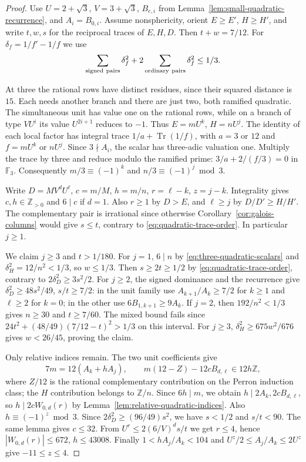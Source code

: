 \documentclass[11pt,reqno]{amsart}
\theoremstyle{remark}\newtheorem{remark}[theorem]{Remark}
\numberwithin{equation}{section}
\begin{document}
\begin{proof}
Use $U=2+\sqrt3$, $V=3+\sqrt3$, $B_{e,i}$ from
Lemma~\ref{lem:small-quadratic-recurrence}, and $A_i=B_{0,i}$.
Assume nonsphericity, orient $E\ge E'$, $H\ge H'$, and write
$t,w,s$ for the reciprocal traces of $E,H,D$. Then $t+w=7/12$.
For $\delta_f=1/f'-1/f$ we use
\begin{equation}\label{eq:twelve-312-mixed}
 \sum_{\rm signed\ pairs}\delta_f^2+
 2\sum_{\rm ordinary\ pairs}\delta_f^2\le1/3 .
\end{equation}

At three the rational rows have distinct residues, since their
squared distance is $15$. Each needs another branch and there
are just two, both ramified quadratic. The simultaneous unit has
value one on the rational rows, while on a branch of type $VU^i$
its value $U^{2i+1}$ reduces to $-1$. Thus $E=mU^k$, $H=nU^j$.
The identity of each local factor has integral trace
$1/a+\operatorname{Tr}(1/f)$, with $a=3$ or $12$ and
$f=mU^k$ or $nU^j$. Since $3\nmid A_i$, the scalar has
three-adic valuation one. Multiply the trace by three and reduce
modulo the ramified prime: $3/a+2/(f/3)=0$ in $\mathbb F_3$.
Consequently $m/3\equiv(-1)^k$ and $n/3\equiv(-1)^j\bmod3$.

Write $D=MV^dU^\ell$, $c=m/M$, $h=m/n$, $r=\ell-k$, $z=j-k$.
Integrality gives $c,h\in\mathbb Z_{>0}$ and $6\mid c$ if $d=1$.
Also $r\ge1$ by $D>E$, and $\ell\ge j$ by $D/D'\ge H/H'$.
The complementary pair is irrational since otherwise
Corollary~\ref{cor:galois-columns} would give $s\le t$, contrary to
\eqref{eq:quadratic-trace-order}. In particular $j\ge1$.

We claim $j\ge3$ and $t>1/180$. For $j=1$, $6\mid n$ by
\eqref{eq:three-quadratic-scalars} and $\delta_H^2=12/n^2<1/3$,
so $w\le1/3$. Then $s\ge2t\ge1/2$ by
\eqref{eq:quadratic-trace-order}, contrary to
$2\delta_D^2\ge3s^2/2$. For $j\ge2$, the signed dominance and
the recurrence give $\delta_D^2\ge48s^2/49$, $s/t\ge7/2$:
in the unit family use $A_{k+1}/A_k\ge7/2$ for $k\ge1$ and
$\ell\ge2$ for $k=0$; in the other use $6B_{1,k+1}\ge9A_k$.
If $j=2$, then $192/n^2<1/3$ gives $n\ge30$ and $t\ge7/60$.
The mixed bound fails since $24t^2+(48/49)(7/12-t)^2>1/3$
on this interval. For $j\ge3$, $\delta_H^2\ge675w^2/676$
gives $w<26/45$, proving the claim.

Only relative indices remain. The two unit coefficients give
\[
 7m=12(A_k+hA_j),\qquad
 m(12-Z)-12cB_{d,\ell}\in12h\mathbb Z,
\]
where $Z/12$ is the rational complementary contribution on the
Perron induction class; the $H$ contribution belongs to
$\mathbb Z/n$. Since $6h\mid m$, we obtain
$h\mid2A_k,2cB_{d,\ell}$, so
$h\mid2cW_{0,d}(r)$ by Lemma~\ref{lem:relative-quadratic-indices}.
Also $h\equiv(-1)^z\bmod3$. Since $2\delta_D^2\ge(96/49)s^2$, we have $s<1/2$ and $s/t<90$.
The same lemma gives $c\le32$. From $U^r\le2(6/V)^d s/t$ we get $r\le4$, hence
$|W_{0,d}(r)|\le672$, $h\le43008$. Finally $1<hA_j/A_k<104$ and
$U^z/2\le A_j/A_k\le2U^z$ give $-11\le z\le4$.


\end{proof}
\end{document}
